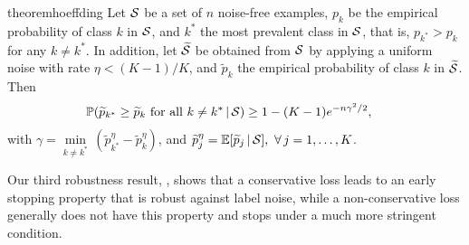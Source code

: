 \documentclass[letterpaper]{article} %
\newcommand{\Em}{{\mathbb{E}}}
\newcommand{\Pm}{{\mathbb{P}}}
\newcommand{\bx}{{\bm{x}}}
\newcommand{\by}{{\bm{y}}}
\newcommand{\gvn}{\,|\,}
\newcommand{\cS}{{\cal{S}}}
\begin{document}
\begin{restatable}[]{theorem}{hoeffding} \label{thm:hoeffding}
	Let $\cS$ be a set of $n$ noise-free examples, $p_{k}$ be the empirical
	probability of class $k$ in $\cS$, and $k^*$ the most prevalent class in
	$\cS$, that is, $p_{k^*}>p_{k}$ for any $k\ne k^*$.
	In addition, let $\widetilde{\cS}$ be obtained from $\cS$ by applying a
	uniform noise with rate $\eta < (K-1)/K$, and $\widetilde{p}_k$ the empirical
	probability of class $k$ in $\widetilde{\cS}$.
	Then
	\begin{align*}
		\Pm(\widetilde{p}_{k^*}\geq \widetilde{p}_{k} \text{ for all $k \neq k^{*}$}
		\gvn \cS)
		&\geq 1-(K-1) e^{-n\gamma^2/2},
	\end{align*}
	with
	$\gamma = \underset{k\ne k^*}{\min}\,(\widetilde{p}_{k^*}^{\eta} - \widetilde{p}_{k}^{\eta})$,
	and
	$\widetilde{p}_{j}^{\eta}=\Em [\widetilde{p}_j\gvn \cS],\ \forall\,j=1,\ldots,K$.
\end{restatable}






Our third robustness result, , shows that a
conservative loss leads to an early stopping property that is robust against
label noise, while a non-conservative loss generally does not have this
property and stops under a much more stringent condition.
\end{document}
